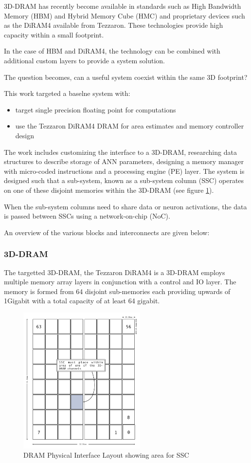 \documentclass[journal]{IEEEtran}
\begin{document}
3D-DRAM has recently become available in standards such as High Bandwidth Memory (HBM) and Hybrid Memory Cube (HMC) and proprietary devices such as the DiRAM4 available from Tezzaron. 
These technologies provide high capacity within a small footprint.

In the case of HBM and DiRAM4, the technology can be combined with additional custom layers to provide a system solution.

The question becomes, can a useful system coexist within the same 3D footprint?

This work targeted a baselne system with:
\begin{itemize}
  \item target single precision floating point for computations
  \item use the Tezzaron DiRAM4 DRAM for area estimates and memory controller design
\end{itemize}
The work includes customizing the interface to a 3D-DRAM, researching data structures to describe storage of ANN parameters, designing a memory manager with micro-coded instructions and a processing engine (PE) layer.  
The system is designed such that a sub-system, known as a sub-system column (SSC) operates on one of these disjoint memories within the 3D-DRAM  (see figure \ref{fig:diram4Layout}).

When the sub-system columns need to share data or neuron activations, the data is passed between SSCs using a network-on-chip (NoC).

An overview of the various blocks and interconnects are given below:

\subsubsection{3D-DRAM}
The targetted 3D-DRAM, the Tezzaron DiRAM4 is a 3D-DRAM employs multiple memory array layers in conjunction with a control and IO layer.
The memory is formed from 64 disjoint sub-memories each providing upwards of 1Gigabit with a total capacity of at least 64 gigabit.
\begin{figure}[!t]
\captionsetup{width=.9\linewidth}
\centerline{
\mbox{\includegraphics[width=2.5in]{DiRAM4Layout.jpg}}
}
\caption{DRAM Physical Interface Layout showing area for SSC}
\label{fig:diram4Layout}
\end{figure}
\end{document}
